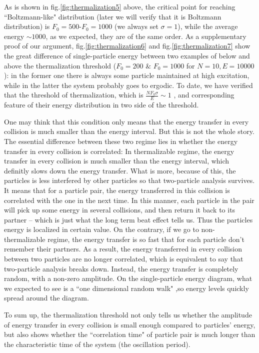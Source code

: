 \documentclass[aps,pre,twocolumn
,groupedaddress]{revtex4-1}
\begin{document}
As is shown in fig.\ref{fig:thermalization5} above, the critical point for reaching ``Boltzmann-like" distribution (later we will verify that it is Boltzmann distribution) is $F_0=500$-$F_0=1000$ (we always set $\sigma=1$), while the average energy $\sim 1000$, as we expected, they are of the same order. As a supplementary proof of our argument, fig.\ref{fig:thermalization6} and fig.\ref{fig:thermalization7} show the great difference of single-particle energy between two examples of below and above the thermalization threshold ($F_0=200$ $\&$ $F_0=1000$ for $N=10, E=10000$): in the former one there is always some particle maintained at high excitation, while in the latter the system probably goes to ergodic. To date, we have verified that the threshold of thermalization, which is $\frac{NF_0\sigma}{E}\sim1 $ , and corresponding feature of their energy distribution in two side of the threshold.

One may think that this condition only means that the energy transfer in every collision is much smaller than the energy interval. But this is not the whole story. The essential difference between these two regime lies in whether the energy transfer in every collision is correlated: In thermalizable regime, the energy transfer in every collision is much smaller than the energy interval, which definitly slows down the energy transfer. What is more, because of this, the particles is less interfered by other particles so that two-particle analysis survives. It means that for a particle pair, the energy transferred in this collision is correlated with the one in the next time. In this manner, each particle in the pair will pick up some energy in several collisions, and then return it back to its partner -- which is just what the long term beat effect tells us. Thus the particles energy is localized in certain value. On the contrary, if we go to non-thermalizable regime, the energy transfer is so fast that for each particle don't remember their partners. As a result, the energy transferred in every collision between two particles are no longer correlated, which is equivalent to say that two-particle analysis breaks down. Instead, the energy transfer is completely random, with a non-zero amplitude. On the single-particle energy diagram, what we expected to see is a ``one dimensional random walk" ,so energy levels quickly spread around the diagram.

To sum up, the thermalization threshold not only tells us whether the amplitude of energy transfer in every collision is small enough compared to particles' energy, but also shows whether the ``correlation time" of particle pair is much longer than the characteristic time of the system (the oscillation period).  
\end{document}
